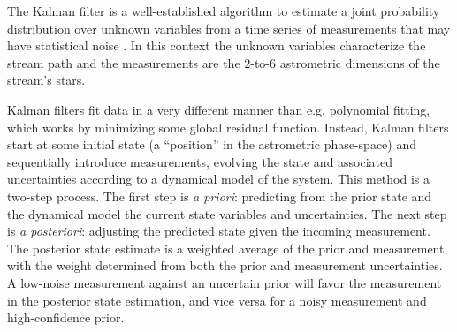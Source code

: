 \documentclass[fleqn,usenatbib]{mnras}
\begin{document}


    The Kalman filter is a well-established algorithm to estimate a joint
    probability distribution over unknown variables from a time series of
    measurements that may have statistical noise \citep{Kalman1960}. In this
    context the unknown variables characterize the stream path and the
    measurements are the 2-to-6 astrometric dimensions of the stream's stars.

    Kalman filters fit data in a very different manner than e.g. polynomial
    fitting, which works by minimizing some global residual function. Instead,
    Kalman filters start at some initial state (a ``position'' in the
    astrometric phase-space) and sequentially introduce measurements, evolving
    the state and associated uncertainties according to a dynamical model of the
    system. This method is a two-step process. The first step is \textit{a
    priori}: predicting from the prior state and the dynamical model the current
    state variables and uncertainties. The next step is \textit{a posteriori}:
    adjusting the predicted state given the incoming measurement. The posterior
    state estimate is a weighted average of the prior and measurement, with the
    weight determined from both the prior and measurement uncertainties. A
    low-noise measurement against an uncertain prior will favor the measurement
    in the posterior state estimation, and vice versa for a noisy measurement
    and high-confidence prior.


\end{document}
